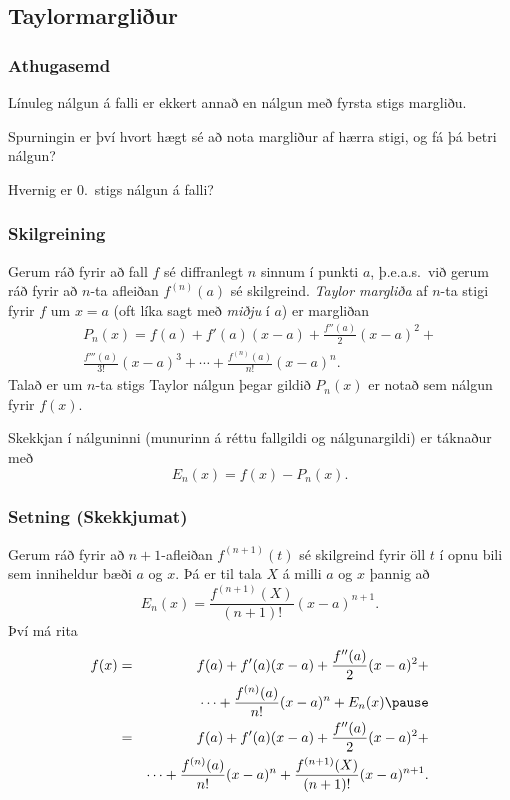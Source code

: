\documentclass[icelandic,a4paper,12pt]{article}
\begin{document}
\subsection{Taylormargliður}
\subsubsection{Athugasemd}
Línuleg nálgun á falli er ekkert annað en nálgun með fyrsta stigs
margliðu. 

Spurningin er því hvort hægt sé að nota margliður af hærra stigi, og
fá þá betri nálgun?

Hvernig er 0.~stigs nálgun á falli?

\subsubsection{Skilgreining}   
Gerum ráð fyrir að fall $f$ sé diffranlegt $n$ sinnum í punkti $a$, \pause
þ.e.a.s.\ við gerum ráð fyrir að $n$-ta afleiðan $f^{(n)}(a)$ sé skilgreind.\pause
\emph{Taylor margliða} af $n$-ta stigi fyrir $f$ um  $x=a$  
(oft líka sagt með \emph{miðju} í $a$) er margliðan 
\begin{multline*}
	P_n(x)=f(a)+f'(a)(x-a)+\frac{f''(a)}{2}(x-a)^2+ \\
	\frac{f'''(a)}{3!}(x-a)^3+\cdots+\frac{f^{(n)}(a)}{n!}(x-a)^n.
\end{multline*}
\pause
Talað er um $n$-ta stigs Taylor nálgun þegar gildið 
$P_n(x)$ er notað sem nálgun fyrir $f(x)$.

\pause

Skekkjan í nálguninni (munurinn á réttu fallgildi og nálgunargildi)
er táknaður með 
$$
	E_n(x)=f(x)-P_n(x).
$$

\subsubsection{Setning (Skekkjumat)}
 Gerum ráð fyrir að $n+1$-afleiðan  $f^{(n+1)}(t)$ sé skilgreind fyrir 
öll $t$ í opnu bili sem inniheldur bæði $a$ og $x$.  \pause
Þá er til tala $X$ á milli $a$ og $x$ þannig að 
$$E_n(x)=\frac{f^{(n+1)}(X)}{(n+1)!}(x-a)^{n+1}.$$
\pause
Því má rita 
\begin{eqnarray*}
f(x)&=&f(a)+f'(a)(x-a)+\frac{f''(a)}{2}(x-a)^2+ \\
& & \cdots+\frac{f^{(n)}(a)}{n!}(x-a)^n+E_n(x)\pause\\
&=&f(a)+f'(a)(x-a)+\frac{f''(a)}{2}(x-a)^2+\\
& & \cdots+\frac{f^{(n)}(a)}{n!}(x-a)^n
+\frac{f^{(n+1)}(X)}{(n+1)!}(x-a)^{n+1}.
\end{eqnarray*}
\end{document}
